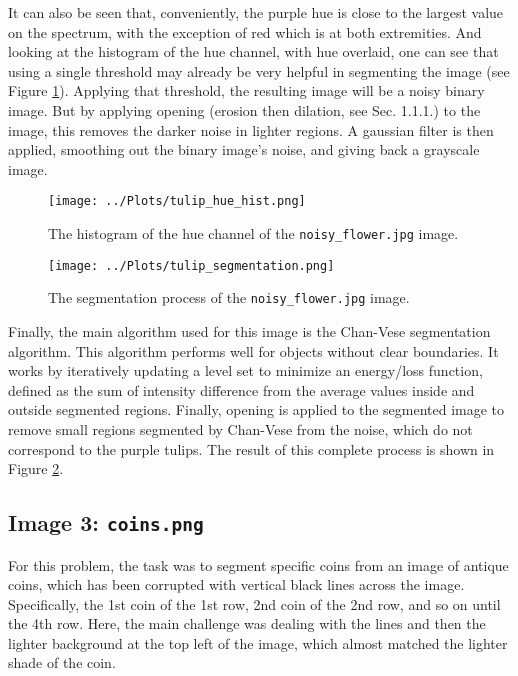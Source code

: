 \documentclass[12pt]{report} %
\begin{document}
It can also be seen that, conveniently, the purple hue is close to the largest value on the spectrum, with the exception of red which is at both extremities. And looking at the histogram of the hue channel, with hue overlaid, one can see that using a single threshold may already be very helpful in segmenting the image (see Figure \ref{fig:hsv_hist}). Applying that threshold, the resulting image will be a noisy binary image. But by applying opening (erosion then dilation, see Sec. 1.1.1.) to the image, this removes the darker noise in lighter regions. A gaussian filter is then applied\cite[pp. 166-170]{gonzalez2002digital}, smoothing out the binary image's noise, and giving back a grayscale image.

\begin{figure}[htbp]
    \centering
    \texttt{[image: ../Plots/tulip\_hue\_hist.png]}
    \caption{The histogram of the hue channel of the \texttt{noisy\_flower.jpg} image.}
    \label{fig:hsv_hist}
\end{figure}

\begin{figure}[htbp]
    \centering
    \texttt{[image: ../Plots/tulip\_segmentation.png]}
    \caption{The segmentation process of the \texttt{noisy\_flower.jpg} image.}
    \label{fig:tulip_segmentation}
\end{figure}

\newpage

Finally, the main algorithm used for this image is the Chan-Vese segmentation algorithm\cite{chan1999active}. This algorithm performs well for objects without clear boundaries. It works by iteratively updating a level set to minimize an energy/loss function, defined as the sum of intensity difference from the average values inside and outside segmented regions\cite{skimage_chan_vese}. Finally, opening is applied to the segmented image to remove small regions segmented by Chan-Vese from the noise, which do not correspond to the purple tulips. The result of this complete process is shown in Figure \ref{fig:tulip_segmentation}.

\newpage

\subsection{Image 3: \texttt{coins.png}}

For this problem, the task was to segment specific coins from an image of antique coins, which has been corrupted with vertical black lines across the image. Specifically, the 1st coin of the 1st row, 2nd coin of the 2nd row, and so on until the 4th row. Here, the main challenge was dealing with the lines and then the lighter background at the top left of the image, which almost matched the lighter shade of the coin.
\end{document}
